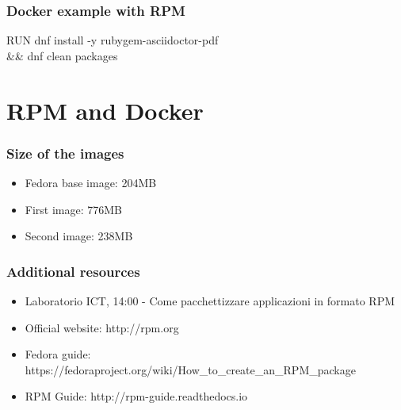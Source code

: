 \documentclass[t,aspectratio=169]{beamer}
\begin{document}
\begin{frame}[fragile]
    \frametitle{Docker example with RPM}
    \begin{semiverbatim}
RUN dnf install -y rubygem-asciidoctor-pdf \\
  \&\& dnf clean packages
    \end{semiverbatim}
\end{frame}

\section{RPM and Docker}
\begin{frame}
    \frametitle{Size of the images}
    \begin{itemize}
        \item Fedora base image: 204MB
        \item<2-> First image: 776MB
        \item<3-> Second image: 238MB
    \end{itemize}
\end{frame}

\begin{frame}
    \frametitle{Additional resources}
    \begin{itemize}
        \item Laboratorio ICT, 14:00 - Come pacchettizzare applicazioni in formato RPM
        \item Official website: http://rpm.org
        \item Fedora guide: https://fedoraproject.org/wiki/How\_to\_create\_an\_RPM\_package
        \item RPM Guide: http://rpm-guide.readthedocs.io
    \end{itemize}
\end{frame}

\end{document}
